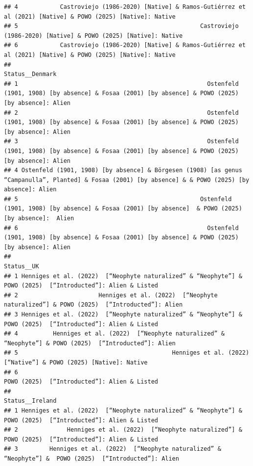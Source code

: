 \documentclass[
]{article}
\begin{document}
\begin{verbatim}
## 4            Castroviejo (1986-2020) [Native] & Ramos-Gutiérrez et al (2021) [Native] & POWO (2025) [Native]: Native
## 5                                                    Castroviejo (1986-2020) [Native] & POWO (2025) [Native]: Native
## 6            Castroviejo (1986-2020) [Native] & Ramos-Gutiérrez et al (2021) [Native] & POWO (2025) [Native]: Native
##                                                                                                                                          Status__Denmark
## 1                                                      Ostenfeld (1901, 1908) [by absence] & Fosaa (2001) [by absence] & POWO (2025) [by absence]: Alien
## 2                                                      Ostenfeld (1901, 1908) [by absence] & Fosaa (2001) [by absence] & POWO (2025) [by absence]: Alien
## 3                                                      Ostenfeld (1901, 1908) [by absence] & Fosaa (2001) [by absence] & POWO (2025) [by absence]: Alien
## 4 Ostenfeld (1901, 1908) [by absence] & Börgesen (1908) [as genus “Campanulla”, Planted] & Fosaa (2001) [by absence] & & POWO (2025) [by absence]: Alien
## 5                                                    Ostenfeld (1901, 1908) [by absence] & Fosaa (2001) [by absence]  & POWO (2025) [by absence]:  Alien
## 6                                                      Ostenfeld (1901, 1908) [by absence] & Fosaa (2001) [by absence] & POWO (2025) [by absence]: Alien
##                                                                                                     Status__UK
## 1 Henniges et al. (2022)  [“Neophyte naturalized” & “Neophyte”] & POWO (2025)  [“Introducted”]: Alien & Listed
## 2                       Henniges et al. (2022)  [“Neophyte naturalized”] & POWO (2025)  [“Introducted”]: Alien
## 3 Henniges et al. (2022)  [“Neophyte naturalized” & “Neophyte”] & POWO (2025)  [“Introducted”]: Alien & Listed
## 4          Henniges et al. (2022)  [“Neophyte naturalized” & “Neophyte”] & POWO (2025)  [“Introducted”]: Alien
## 5                                            Henniges et al. (2022)  [“Native”] & POWO (2025) [Native]: Native
## 6                                                                 POWO (2025)  [“Introducted”]: Alien & Listed
##                                                                                                Status__Ireland
## 1 Henniges et al. (2022)  [“Neophyte naturalized” & “Neophyte”] & POWO (2025)  [“Introducted”]: Alien & Listed
## 2              Henniges et al. (2022)  [“Neophyte naturalized”] & POWO (2025)  [“Introducted”]: Alien & Listed
## 3         Henniges et al. (2022)  [“Neophyte naturalized” & “Neophyte”] &  POWO (2025)  [“Introducted”]: Alien

\end{verbatim}
\end{document}
